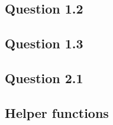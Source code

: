 \subsection{Question 1.2}\label{app:ex12}


\subsection{Question 1.3}\label{app:ex13}


\subsection{Question 2.1}\label{app:ex13}


\subsection{Helper functions}\label{app:helpers}



\pagebreak



